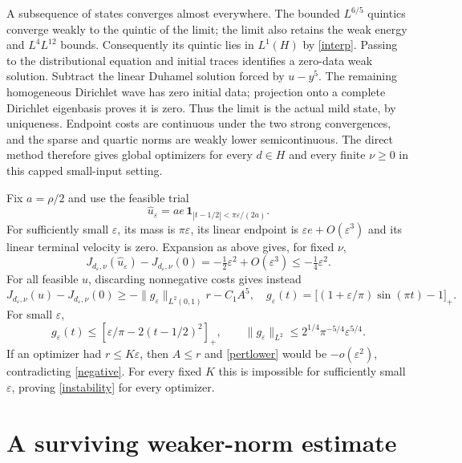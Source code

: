 \documentclass[11pt]{article}
\newcommand{\norm}[1]{\lVert #1\rVert}
\begin{document}
A subsequence of states converges almost everywhere. The bounded
$L^{6/5}$ quintics converge weakly to the quintic of the limit; the limit
also retains the weak energy and $L^4L^{12}$ bounds. Consequently its
quintic lies in $L^1(H)$ by \eqref{interp}. Passing to the distributional
equation and initial traces identifies a zero-data weak solution.
Subtract the linear Duhamel solution forced by $u-y^5$. The remaining
homogeneous Dirichlet wave has zero initial data; projection onto a
complete Dirichlet eigenbasis proves it is zero. Thus the limit is the
actual mild state, by uniqueness. Endpoint costs are continuous under the
two strong convergences, and the sparse and quartic norms are weakly lower
semicontinuous. The direct method therefore gives global optimizers for
every $d\in H$ and every finite $\nu\ge0$ in this capped small-input setting.

Fix $a=\rho/2$ and use the feasible trial
\[
 \widehat u_\varepsilon=a e\,
 \mathbf1_{|t-1/2|<\pi\varepsilon/(2a)}.
\]
For sufficiently small $\varepsilon$, its mass is $\pi\varepsilon$,
its linear endpoint is $\varepsilon e+O(\varepsilon^3)$ and its linear
terminal velocity is zero. Expansion as above gives, for fixed $\nu$,
\begin{equation}\label{negative}
 J_{d_\varepsilon,\nu}(\widehat u_\varepsilon)
       -J_{d_\varepsilon,\nu}(0)
    =-\tfrac12\varepsilon^2+O(\varepsilon^3)
    \le-\tfrac14\varepsilon^2.
\end{equation}
For all feasible $u$, discarding nonnegative costs gives instead
\begin{equation}\label{pertlower}
 J_{d_\varepsilon,\nu}(u)-J_{d_\varepsilon,\nu}(0)
 \ge-\norm{g_\varepsilon}_{L^2(0,1)}r-C_1 A^5,
 \quad
 g_\varepsilon(t)=\big[(1+\varepsilon/\pi)\sin(\pi t)-1\big]_+.
\end{equation}
For small $\varepsilon$,
\begin{equation}\label{dualbound}
 g_\varepsilon(t)\le[\varepsilon/\pi-2(t-1/2)^2]_+,
 \qquad
 \norm{g_\varepsilon}_{L^2}
       \le 2^{1/4}\pi^{-5/4}\varepsilon^{5/4}.
\end{equation}
If an optimizer had $r\le K\varepsilon$, then $A\le r$ and
\eqref{pertlower} would be $-o(\varepsilon^2)$, contradicting
\eqref{negative}. For every fixed $K$ this is impossible for sufficiently
small $\varepsilon$, proving \eqref{instability} for every optimizer.

\section{A surviving weaker-norm estimate}
\end{document}
